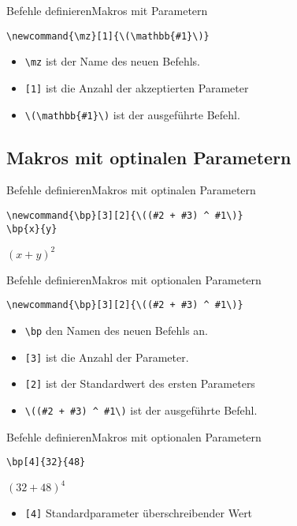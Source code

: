 \documentclass[10pt,a4paper, ngerman]{beamer}
\begin{document}
\begin{frame}[fragile]{Befehle definieren}{Makros mit Parametern}
\begin{lstlisting}
\newcommand{\mz}[1]{\(\mathbb{#1}\)}
\end{lstlisting}
\begin{itemize}
\item \lstinline|\mz|  ist der Name des neuen Befehls.
\item \lstinline|[1]|  ist die Anzahl der akzeptierten Parameter
\item \lstinline|\(\mathbb{#1}\)|  ist der ausgeführte Befehl. 
\end{itemize}
\end{frame}
\newcommand{\bp}[3][2]{\((#2 + #3) ^ #1\)}
\subsection{Makros mit optinalen Parametern}
\begin{frame}[fragile]{Befehle definieren}{Makros mit optinalen Parametern}
\begin{lstlisting}[caption = binomisch Plus]
\newcommand{\bp}[3][2]{\((#2 + #3) ^ #1\)}
\bp{x}{y}
\end{lstlisting}
\begin{hlbox}
\bp{x}{y}
\end{hlbox}
\end{frame}

\begin{frame}[fragile]{Befehle definieren}{Makros mit optionalen Parametern}
\begin{lstlisting}
\newcommand{\bp}[3][2]{\((#2 + #3) ^ #1\)}
\end{lstlisting}
\begin{itemize}
\item \lstinline|\bp| den Namen des neuen Befehls an. 
\item \lstinline|[3]| ist die Anzahl der Parameter. 
\item \lstinline|[2]| ist der Standardwert des ersten Parameters
\item \lstinline|\((#2 + #3) ^ #1\)| ist der ausgeführte Befehl.
\end{itemize}
\end{frame}

\begin{frame}[fragile]{Befehle definieren}{Makros mit optionalen Parametern}
\begin{lstlisting}[caption = binomisch Plus hoch 4]
\bp[4]{32}{48}
\end{lstlisting}
\begin{hlbox}
\bp[4]{32}{48}
\end{hlbox}
\begin{itemize}
\item \lstinline|[4]| Standardparameter überschreibender Wert
\end{itemize}
\end{frame}
\end{document}
